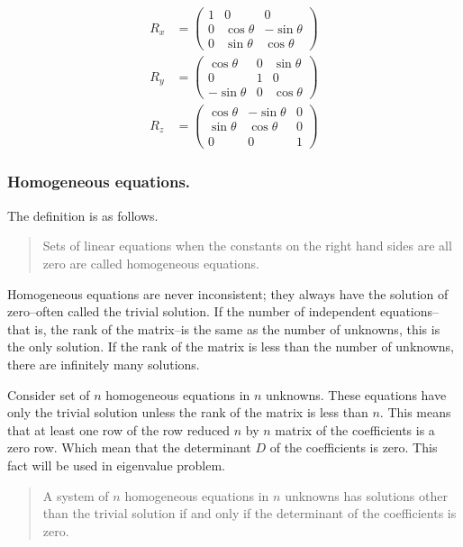 \documentclass[../main.tex]{subfiles}
\begin{document}
\begin{align*}
    R_x&=\begin{pmatrix}
        1&0&0\\
        0&\cos\theta&-\sin\theta\\
        0&\sin\theta&\cos\theta
    \end{pmatrix}\\
    R_y&=\begin{pmatrix}
        \cos\theta&0&\sin\theta\\
        0&1&0\\
        -\sin\theta&0&\cos\theta
    \end{pmatrix}\\
    R_z&=\begin{pmatrix}
        \cos \theta&-\sin \theta&0\\
        \sin \theta& \cos \theta&0\\
        0&0&1
    \end{pmatrix}
\end{align*}

\subsubsection*{Homogeneous equations.} The definition is as follows.

\begin{quote}
    Sets of linear equations when the constants on the right hand sides are all zero are called homogeneous equations.
\end{quote}

Homogeneous equations are never inconsistent; they always have the solution of zero--often called the trivial solution. 
If the number of independent equations--that is, the rank of the matrix--is the same as the number of unknowns, this is the only solution. 
If the rank of the matrix is less than the number of unknowns, there are infinitely many solutions.

Consider set of $n$ homogeneous equations in $n$ unknowns.
These equations have only the trivial solution unless the rank of the matrix is less than $n$. 
This means that at least one row of the row reduced $n$ by $n$ matrix of the coefficients is a zero row. 
Which mean that the determinant $D$ of the coefficients is zero.
This fact will be used in eigenvalue problem.

\begin{quote}
    A system of $n$ homogeneous equations in $n$ unknowns has solutions other than the trivial solution if and only if the determinant of the coefficients is zero.
\end{quote}
\end{document}
